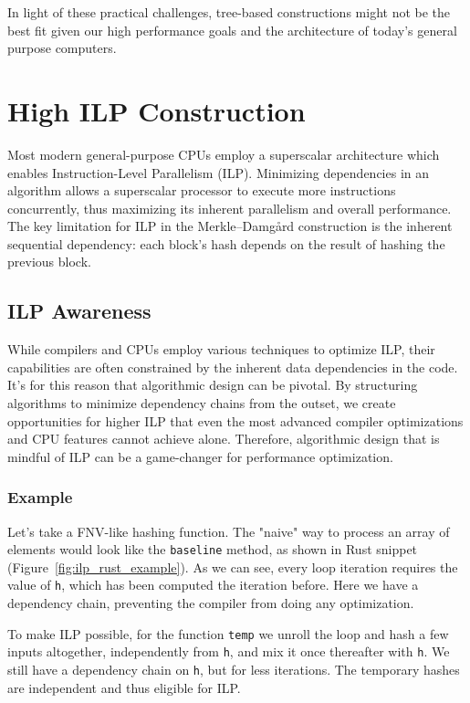 \documentclass[10pt]{article}
\begin{document}
In light of these practical challenges, tree-based constructions might not be the best fit given our high performance goals and the architecture of today's general purpose computers.

\clearpage
\section{High ILP Construction} \label{highilp}

Most modern general-purpose CPUs employ a superscalar architecture which enables Instruction-Level Parallelism (ILP). 
Minimizing dependencies in an algorithm allows a superscalar processor to execute more instructions concurrently,
thus maximizing its inherent parallelism and overall performance.
The key limitation for ILP in the Merkle–Damgård construction is the inherent sequential dependency:
each block's hash depends on the result of hashing the previous block.

\subsection{ILP Awareness}

While compilers and CPUs employ various techniques to optimize ILP, their capabilities are often constrained by the inherent data dependencies
in the code. It's for this reason that algorithmic design can be pivotal. By structuring algorithms to minimize dependency chains from the outset,
we create opportunities for higher ILP that even the most advanced compiler optimizations and CPU features cannot achieve alone. Therefore,
algorithmic design that is mindful of ILP can be a game-changer for performance optimization.

\subsubsection{Example}
Let's take a FNV-like hashing function. The "naive" way to process an array of elements would look like the \texttt{baseline} method,
as shown in Rust snippet (Figure~\ref{fig:ilp_rust_example}). As we can see, every loop iteration requires the value of \texttt{h},
which has been computed the iteration before. Here we have a dependency chain, preventing the compiler from doing any optimization.

To make ILP possible, for the function \texttt{temp} we unroll the loop and hash a few inputs altogether, independently from \texttt{h},
and mix it once thereafter with \texttt{h}. We still have a dependency chain on \texttt{h}, but for less iterations.
The temporary hashes are independent and thus eligible for ILP.
\end{document}
